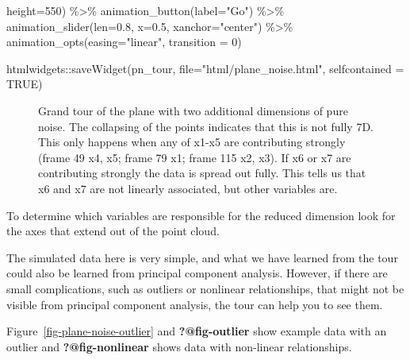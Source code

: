 \documentclass[
  letterpaper,
]{book}
\newenvironment{Shaded}{\begin{snugshade}}{\end{snugshade}}
\newcommand{\AttributeTok}[1]{\textcolor[rgb]{0.40,0.45,0.13}{#1}}
\newcommand{\ConstantTok}[1]{\textcolor[rgb]{0.56,0.35,0.01}{#1}}
\newcommand{\DecValTok}[1]{\textcolor[rgb]{0.68,0.00,0.00}{#1}}
\newcommand{\FloatTok}[1]{\textcolor[rgb]{0.68,0.00,0.00}{#1}}
\newcommand{\FunctionTok}[1]{\textcolor[rgb]{0.28,0.35,0.67}{#1}}
\newcommand{\NormalTok}[1]{\textcolor[rgb]{0.00,0.23,0.31}{#1}}
\newcommand{\SpecialCharTok}[1]{\textcolor[rgb]{0.37,0.37,0.37}{#1}}
\newcommand{\StringTok}[1]{\textcolor[rgb]{0.13,0.47,0.30}{#1}}
\begin{document}
\begin{Shaded}
\begin{Highlighting}[]
                        \AttributeTok{height=}\DecValTok{550}\NormalTok{) }\SpecialCharTok{\%\textgreater{}\%}
       \FunctionTok{animation\_button}\NormalTok{(}\AttributeTok{label=}\StringTok{"Go"}\NormalTok{) }\SpecialCharTok{\%\textgreater{}\%}
       \FunctionTok{animation\_slider}\NormalTok{(}\AttributeTok{len=}\FloatTok{0.8}\NormalTok{, }\AttributeTok{x=}\FloatTok{0.5}\NormalTok{,}
                        \AttributeTok{xanchor=}\StringTok{"center"}\NormalTok{) }\SpecialCharTok{\%\textgreater{}\%}
       \FunctionTok{animation\_opts}\NormalTok{(}\AttributeTok{easing=}\StringTok{"linear"}\NormalTok{, }
                      \AttributeTok{transition =} \DecValTok{0}\NormalTok{)}

\NormalTok{htmlwidgets}\SpecialCharTok{::}\FunctionTok{saveWidget}\NormalTok{(pn\_tour,}
          \AttributeTok{file=}\StringTok{"html/plane\_noise.html"}\NormalTok{,}
          \AttributeTok{selfcontained =} \ConstantTok{TRUE}\NormalTok{)}
\end{Highlighting}
\end{Shaded}

\begin{figure}

{\centering 

}

\caption{\label{fig-plane-noise}Grand tour of the plane with two
additional dimensions of pure noise. The collapsing of the points
indicates that this is not fully 7D. This only happens when any of x1-x5
are contributing strongly (frame 49 x4, x5; frame 79 x1; frame 115 x2,
x3). If x6 or x7 are contributing strongly the data is spread out fully.
This tells us that x6 and x7 are not linearly associated, but other
variables are.}

\end{figure}

To determine which variables are responsible for the reduced dimension
look for the axes that extend out of the point cloud.

The simulated data here is very simple, and what we have learned from
the tour could also be learned from principal component analysis.
However, if there are small complications, such as outliers or nonlinear
relationships, that might not be visible from principal component
analysis, the tour can help you to see them.

Figure~\ref{fig-plane-noise-outlier} and \textbf{?@fig-outlier} show
example data with an outlier and \textbf{?@fig-nonlinear} shows data
with non-linear relationships.
\end{document}
